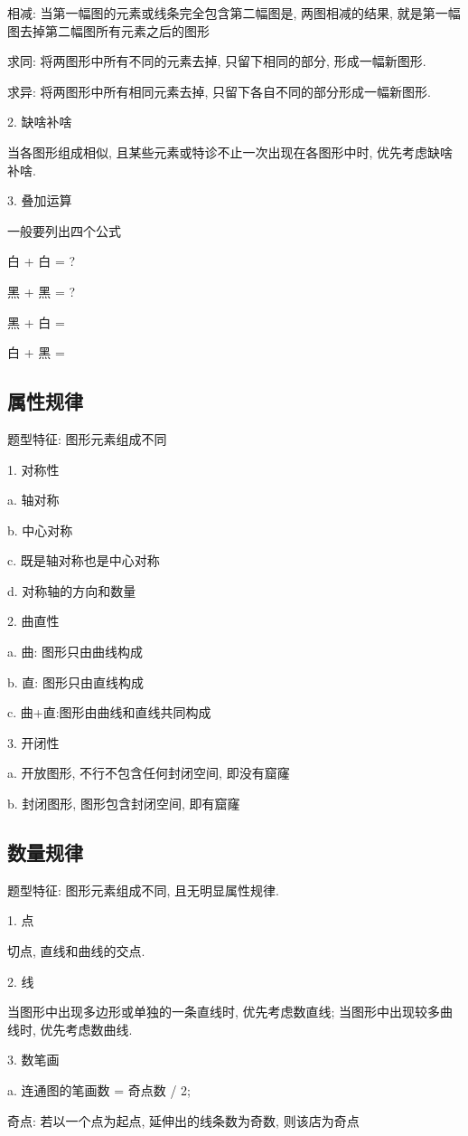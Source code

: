 \documentclass[UTF8]{ctexart}
\begin{document}
相减: 当第一幅图的元素或线条完全包含第二幅图是, 两图相减的结果, 就是第一幅图去掉第二幅图所有元素之后的图形

求同: 将两图形中所有不同的元素去掉, 只留下相同的部分, 形成一幅新图形.

求异: 将两图形中所有相同元素去掉, 只留下各自不同的部分形成一幅新图形.


2. 缺啥补啥

当各图形组成相似, 且某些元素或特诊不止一次出现在各图形中时, 优先考虑缺啥补啥.


3. 叠加运算

一般要列出四个公式

白 + 白 = ?

黑 + 黑 = ?

黑 + 白 =

白 + 黑 =

\subsection{属性规律}
题型特征: 图形元素组成不同

1. 对称性

a. 轴对称

b. 中心对称

c. 既是轴对称也是中心对称

d. 对称轴的方向和数量

2. 曲直性

a. 曲: 图形只由曲线构成

b. 直: 图形只由直线构成

c. 曲+直:图形由曲线和直线共同构成

3. 开闭性

a. 开放图形, 不行不包含任何封闭空间, 即没有窟窿

b. 封闭图形, 图形包含封闭空间, 即有窟窿


\subsection{数量规律}
题型特征: 图形元素组成不同, 且无明显属性规律.

1. 点

切点, 直线和曲线的交点.

2. 线

当图形中出现多边形或单独的一条直线时, 优先考虑数直线; 当图形中出现较多曲线时, 优先考虑数曲线.

3. 数笔画

a. 连通图的笔画数 = 奇点数 / 2;

奇点: 若以一个点为起点, 延伸出的线条数为奇数, 则该店为奇点
\end{document}
